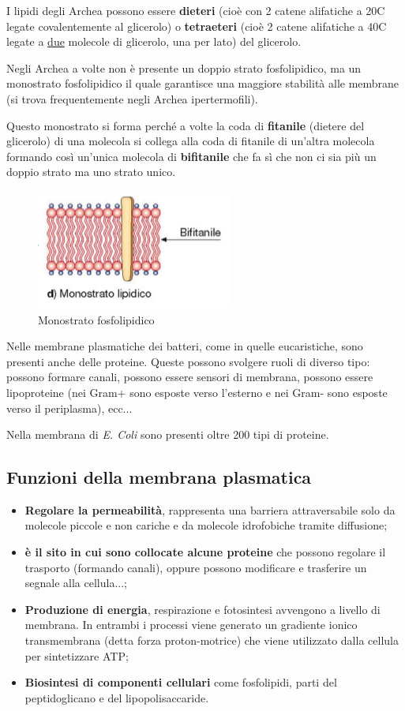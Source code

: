 \documentclass[11pt]{book}
\begin{document}
\vspace{1em}
I lipidi degli Archea possono essere \textbf{dieteri} (cioè con 2 catene alifatiche a 20C legate covalentemente al glicerolo) o \textbf{tetraeteri} (cioè 2 catene alifatiche a 40C legate a \underline{due} molecole di glicerolo, una per lato) del glicerolo. 

Negli Archea a volte non è presente un doppio strato fosfolipidico, ma un monostrato fosfolipidico il quale garantisce una maggiore stabilità alle membrane (si trova frequentemente negli Archea ipertermofili).

Questo monostrato si forma perché a volte la coda di \textbf{fitanile} (dietere del glicerolo) di una molecola si collega alla coda di fitanile di un'altra molecola formando così un'unica molecola di \textbf{bifitanile} che fa sì che non ci sia più un doppio strato ma uno strato unico.

\clearpage
\begin{figure}[htp]
\centering
\includegraphics[scale=0.8]{img/Bifitanile.png}
\caption{Monostrato fosfolipidico}
\label{}
\end{figure}

Nelle membrane plasmatiche dei batteri, come in quelle eucaristiche, sono presenti anche delle proteine.
Queste possono svolgere ruoli di diverso tipo: possono formare canali, possono essere sensori di membrana, possono essere lipoproteine (nei Gram+ sono esposte verso l'esterno e nei Gram- sono esposte verso il periplasma), ecc...

Nella membrana di \emph{E. Coli} sono presenti oltre 200 tipi di proteine.

\subsection{Funzioni della membrana plasmatica}
\begin{itemize}
\item \textbf{Regolare la permeabilità}, rappresenta una barriera attraversabile solo da molecole piccole e non cariche e da molecole idrofobiche tramite diffusione;
\item \textbf{è il sito in cui sono collocate alcune proteine} che possono regolare il trasporto (formando canali), oppure possono modificare e trasferire un segnale alla cellula...;
\item \textbf{Produzione di energia}, respirazione e fotosintesi avvengono a livello di membrana. In entrambi i processi viene generato un gradiente ionico transmembrana (detta forza proton-motrice) che viene utilizzato dalla cellula per sintetizzare ATP;
\item \textbf{Biosintesi di componenti cellulari} come fosfolipidi, parti del peptidoglicano e del lipopolisaccaride.
\end{itemize}
\end{document}
